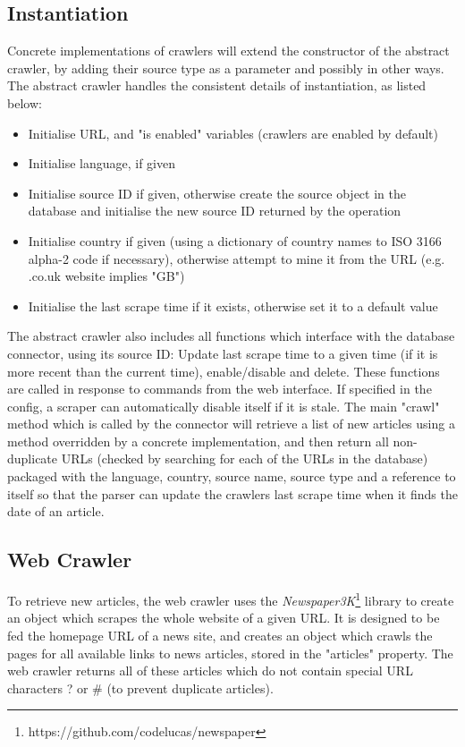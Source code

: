 \documentclass{l4proj}
\begin{document}
\subsection{Instantiation}
Concrete implementations of crawlers will extend the constructor of the abstract crawler, by adding their source type as a parameter and possibly in other ways. The abstract crawler handles the consistent details of instantiation, as listed below:
\begin{itemize}
    \item Initialise URL, and "is enabled" variables (crawlers are enabled by default)
    \item Initialise language, if given
    \item Initialise source ID if given, otherwise create the source object in the database and initialise the new source ID returned by the operation
    \item Initialise country if given (using a dictionary of country names to ISO 3166 alpha-2 code if necessary), otherwise attempt to mine it from the URL (e.g. .co.uk website implies "GB")
    \item Initialise the last scrape time if it exists, otherwise set it to a default value
\end{itemize}
The abstract crawler also includes all functions which interface with the database connector, using its source ID: Update last scrape time to a given time (if it is more recent than the current time), enable/disable and delete. These functions are called in response to commands from the web interface. If specified in the config, a scraper can automatically disable itself if it is stale. The main "crawl" method which is called by the connector will retrieve a list of new articles using a method overridden by a concrete implementation, and then return all non-duplicate URLs (checked by searching for each of the URLs in the database) packaged with the language, country, source name, source type and a reference to itself so that the parser can update the crawlers last scrape time when it finds the date of an article.

\subsection{Web Crawler}
To retrieve new articles, the web crawler uses the \emph{Newspaper3K}\footnote{https://github.com/codelucas/newspaper} library to create an object which scrapes the whole website of a given URL. It is designed to be fed the homepage URL of a news site, and creates an object which crawls the pages for all available links to news articles, stored in the "articles" property. The web crawler returns all of these articles which do not contain special URL characters ? or \# (to prevent duplicate articles).
\end{document}
